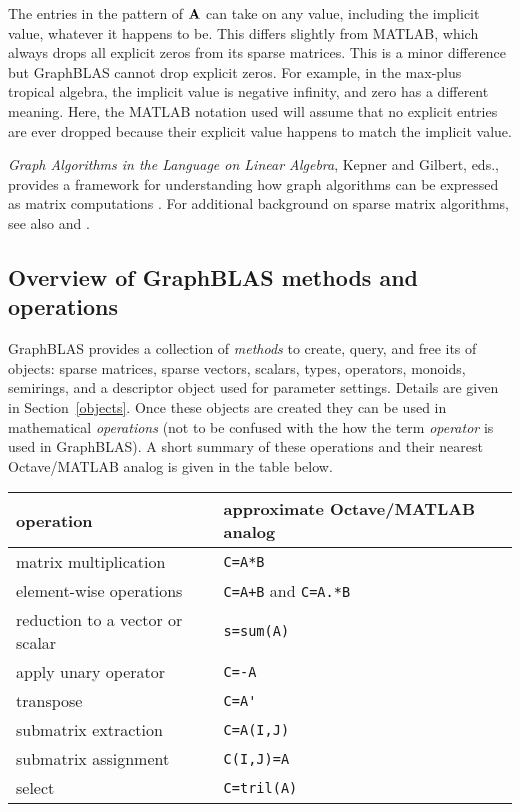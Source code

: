 \documentclass[12pt]{article}
\begin{document}
The entries in the pattern of ${\bf A}$ can take on any value, including the
implicit value, whatever it happens to be.  This differs slightly from MATLAB,
which always drops all explicit zeros from its sparse matrices.  This is a
minor difference but GraphBLAS cannot drop explicit zeros.  For example, in the
max-plus tropical algebra, the implicit value is negative infinity, and zero
has a different meaning.  Here, the MATLAB notation used will assume that no
explicit entries are ever dropped because their explicit value happens to match
the implicit value.

{\em Graph Algorithms in the Language on Linear Algebra}, Kepner and Gilbert,
eds., provides a framework for understanding how graph algorithms can be
expressed as matrix computations \cite{KepnerGilbert2011}.  For additional
background on sparse matrix algorithms, see also \cite{Davis06book} and
\cite{DavisRajamanickamSidLakhdar16}.

\subsection{Overview of GraphBLAS methods and operations} %
\label{overview}

GraphBLAS provides a collection of {\em methods} to create, query, and free its
of objects: sparse matrices, sparse vectors, scalars, types, operators,
monoids, semirings, and a descriptor object used for parameter settings.
Details are given in Section~\ref{objects}.  Once these objects are created
they can be used in mathematical {\em operations} (not to be confused with the
how the term {\em operator} is used in GraphBLAS).  A short summary of these
operations and their nearest Octave/MATLAB analog is given in the table below.

\begin{tabular}{ll}
operation                           & approximate Octave/MATLAB analog \\
\hline
matrix multiplication               & \verb'C=A*B' \\
element-wise operations             & \verb'C=A+B' and \verb'C=A.*B' \\
reduction to a vector or scalar     & \verb's=sum(A)' \\
apply unary operator                & \verb'C=-A' \\
transpose                           & \verb"C=A'" \\
submatrix extraction                & \verb'C=A(I,J)' \\
submatrix assignment                & \verb'C(I,J)=A' \\
select                              & \verb'C=tril(A)' \\
\hline
\end{tabular}
\vspace{0.1in}
\end{document}
